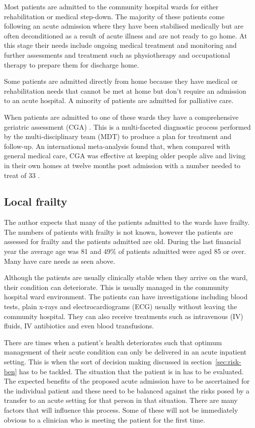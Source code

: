 \documentclass
[
	12pt,
	a4paper,
	oneside,
]{report}
\begin{document}
Most patients are admitted to the community hospital wards for either rehabilitation
or medical step-down. The majority of these patients come following an acute admission
where they have been stabilised medically but are often deconditioned as a result
of acute illness and are not ready to go home. At this stage their needs include 
ongoing medical treatment and monitoring and further assessments and treatment such 
as physiotherapy and occupational therapy to prepare them for discharge home.

Some patients are admitted directly from home because they have medical or rehabilitation
needs that cannot be met at home but don't require an admission to an acute hospital.
A minority of patients are admitted for palliative care.

When patients are admitted to one of these wards they have a comprehensive geriatric 
assessment (CGA) \parencite{bgs:14}. This is a multi-faceted diagnostic process
performed by the multi-disciplinary team (MDT) to produce a plan for treatment 
and follow-up.
An international meta-analysis found that, when compared with general medical care,
CGA was effective at keeping older people alive and living in their own homes at
twelve months post admission with a number needed to treat of 33 \parencite{ellis:11}.

\subsection{Local frailty}

The author expects that many of the patients admitted to the wards have frailty.
The numbers of patients with frailty is not known, however the patients are assessed 
for frailty and the patients admitted are old. During the last financial year the
average age was 81 and 49\% of patients admitted were aged 85 or over. Many have 
care needs as seen above.

Although the patients are usually clinically stable when they arrive on the ward,
their condition can deteriorate. This is usually managed in the community hospital
ward environment. The patients can have investigations including blood tests, plain
x-rays and electrocardiograms (ECG) usually without leaving the community hospital.
They can also receive treatments such as intravenous (IV) fluids, IV antibiotics
and even blood transfusions.

There are times when a patient's health deteriorates such that optimum 
management of their
acute condition can only be delivered in an acute inpatient setting. This is when 
the sort of decision making discussed in section~\ref{sec:risk-ben} has
to be tackled. The situation that the patient is in has to be evaluated. The 
expected benefits of the proposed acute admission have to be ascertained for the
individual patient and these need to be balanced against the risks posed by a transfer
to an acute setting for that person in that situation. There are many factors that 
will influence this process. Some of these will not be immediately obvious to a 
clinician who is meeting the patient for the first time.
\end{document}
